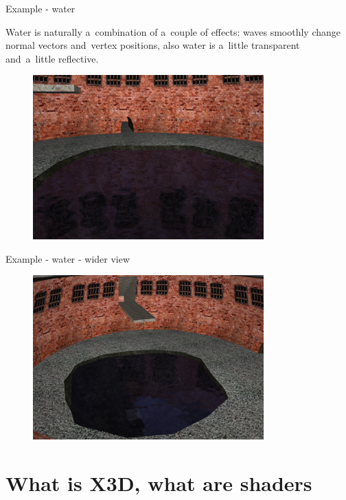 \documentclass{beamer}
\begin{document}
\begin{frame}{Example - water}

Water is naturally a~combination of a~couple of effects: waves smoothly change normal vectors and~vertex positions, also water is a~little transparent and~a~little reflective.

\begin{figure}
  \centering
  \includegraphics[width=3.5in]{water_shaders_1}
\end{figure}
\end{frame}

\begin{frame}{Example - water - wider view}
\begin{figure}
  \centering
  \includegraphics[width=3.5in]{water_shaders_0}
\end{figure}
\end{frame}

\section{What is X3D, what are shaders}
\end{document}
